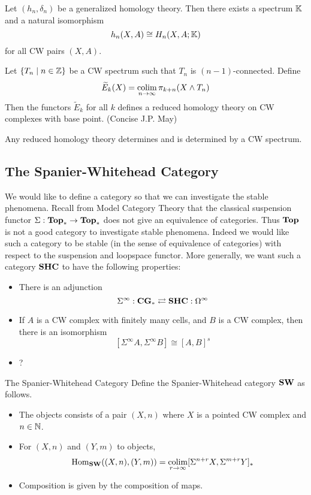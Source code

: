 \documentclass[a4paper]{article}
\begin{document}
\begin{thm}{}{} Let $(h_n,\delta_n)$ be a generalized homology theory. Then there exists a spectrum $\mathbb{K}$ and a natural isomorphism $$h_n(X,A)\cong H_n(X,A;\mathbb{K})$$ for all CW pairs $(X,A)$. 
\end{thm}

\begin{thm}{}{} Let $\{T_n\;|\;n\in\mathbb{Z}\}$ be a CW spectrum such that $T_n$ is $(n-1)$-connected. Define $$\widetilde{E}_k(X)=\operatorname*{colim}_{n\to\infty}\pi_{k+n}(X\wedge T_n)$$ Then the functors $\widetilde{E}_k$ for all $k$ defines a reduced homology theory on CW complexes with base point. (Concise J.P. May)
\end{thm}

\begin{thm}{}{} Any reduced homology theory determines and is determined by a CW spectrum. 
\end{thm}

\subsection{The Spanier-Whitehead Category}
We would like to define a category so that we can investigate the stable phenomena. Recall from Model Category Theory that the classical suspension functor $\Sigma:\bold{Top}_\ast\to\bold{Top}_\ast$ does not give an equivalence of categories. Thus $\bold{Top}$ is not a good category to investigate stable phenomena. Indeed we would like such a category to be stable (in the sense of equivalence of categories) with respect to the suspension and loopspace functor. More generally, we want such a category $\bold{SHC}$ to have the following properties: 
\begin{itemize}
\item There is an adjunction $$\Sigma^\infty:\bold{CG}_\ast\rightleftarrows\bold{SHC}:\Omega^\infty$$
\item If $A$ is a CW complex with finitely many cells, and $B$ is a CW complex, then there is an isomorphism $$[\Sigma^\infty A,\Sigma^\infty B]\cong[A,B]^s$$
\item ?
\end{itemize}

\begin{defn}{The Spanier-Whitehead Category}{} Define the Spanier-Whitehead category $\bold{SW}$ as follows. 
\begin{itemize}
\item The objects consists of a pair $(X,n)$ where $X$ is a pointed CW complex and $n\in\mathbb{N}$. 
\item For $(X,n)$ and $(Y,m)$ to objects, $$\operatorname{Hom}_{\bold{SW}}((X,n),(Y,m))=\operatorname*{colim}_{r\to\infty}[\Sigma^{n+r}X,\Sigma^{m+r}Y]_\ast$$
\item Composition is given by the composition of maps. 
\end{itemize}
\end{defn}
\end{document}
